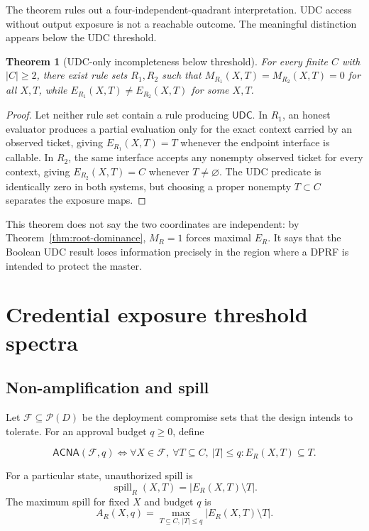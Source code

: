 \documentclass[preprint,12pt]{elsarticle}
\newtheorem{theorem}{Theorem}
\newcommand{\UDC}{\mathsf{UDC}}
\newcommand{\powerset}{\mathcal{P}}
\begin{document}
The theorem rules out a four-independent-quadrant interpretation.
UDC access without output exposure is not a reachable outcome.  The meaningful
distinction appears below the UDC
threshold.

\begin{theorem}[UDC-only incompleteness below threshold]
\label{thm:root-incomplete}
For every finite $C$ with $|C|\ge2$, there exist rule sets $R_1,R_2$ such that
$M_{R_1}(X,T)=M_{R_2}(X,T)=0$ for all $X,T$, while
$E_{R_1}(X,T)\ne E_{R_2}(X,T)$ for some $X,T$.
\end{theorem}

\begin{proof}
Let neither rule set contain a rule producing $\UDC$.  In $R_1$, an honest
evaluator produces a partial evaluation only for the exact context carried by
an observed ticket, giving $E_{R_1}(X,T)=T$ whenever the endpoint interface is
callable.  In $R_2$, the same interface accepts any nonempty observed ticket
for every context, giving $E_{R_2}(X,T)=C$ whenever $T\ne\varnothing$.  The UDC
predicate is identically zero in both systems, but choosing a proper nonempty
$T\subset C$ separates the exposure maps.
\end{proof}

This theorem does not say the two coordinates are independent: by
Theorem~\ref{thm:root-dominance}, $M_R=1$ forces maximal $E_R$.  It says that
the Boolean UDC result loses information precisely in the region where a
DPRF is intended to protect the master.

\section{Credential exposure threshold spectra}

\subsection{Non-amplification and spill}

Let $\mathcal{F}\subseteq\powerset(D)$ be the deployment compromise sets that
the design intends to tolerate.  For an approval budget $q\ge0$, define

\begin{equation}
\mathsf{ACNA}(\mathcal{F},q)\iff
\forall X\in\mathcal{F},\ \forall T\subseteq C,\ |T|\le q:
E_R(X,T)\subseteq T.
\end{equation}

For a particular state, unauthorized spill is
\[
\operatorname{spill}_R(X,T)=|E_R(X,T)\setminus T|.
\]
The maximum spill for fixed $X$ and budget $q$ is
\begin{equation}
A_R(X,q)=\max_{T\subseteq C,\,|T|\le q}
          |E_R(X,T)\setminus T|.
\label{eq:approval-profile}
\end{equation}
\end{document}
